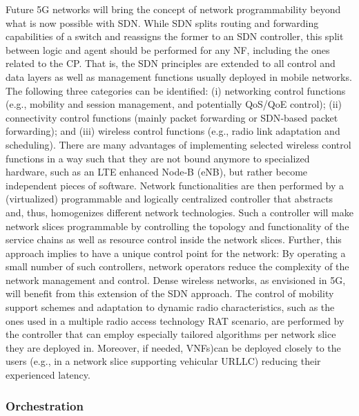 \documentclass{article}
\begin{document}
Future 5G networks will bring the concept of network programmability beyond what is now possible
with SDN. While SDN splits routing and forwarding capabilities of a switch and reassigns the former
to an SDN controller, this split between logic and agent should be performed for any NF, including
the ones related to the CP. That is, the SDN principles are extended to all control and data layers as
well as management functions usually deployed in mobile networks. 
The following three categories can be identified: (i) networking control functions (e.g., mobility and
session management, and potentially QoS/QoE control); (ii) connectivity control functions (mainly
packet forwarding or SDN‐based packet forwarding); and (iii) wireless control functions (e.g., radio
link adaptation and scheduling).
There are many advantages of implementing selected wireless control functions in a way such that
they are not bound anymore to specialized hardware, such as an LTE enhanced Node‐B (eNB), but
rather become independent pieces of software. Network functionalities are then performed by a
(virtualized) programmable and logically centralized controller that abstracts and, thus, homogenizes different network technologies. Such a controller will make network slices programmable
by controlling the topology and functionality of the service chains as well as resource control inside
the network slices. Further, this approach implies to have a unique control point for the network:
By operating a small number of such controllers, network operators reduce the complexity of the
network management and control.
Dense wireless networks, as envisioned in 5G, will benefit from this extension of the SDN approach.
The control of mobility support schemes and adaptation to dynamic radio characteristics, such as
the ones used in a multiple radio access technology \gls{RAT} scenario, are performed by the controller
that can employ especially tailored algorithms per network slice they are deployed in. Moreover, if
needed, VNFs)can be deployed closely to the users (e.g., in a network slice supporting
vehicular URLLC) reducing their experienced latency.


\subsubsection{Orchestration}

\newpage
\end{document}
